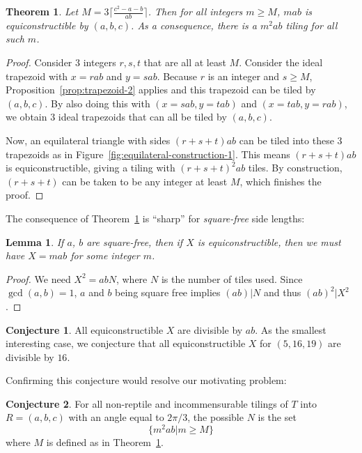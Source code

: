 \documentclass{amsart}
\theoremstyle{plain}
\newtheorem{thm}{Theorem}
\newtheorem{lem}{Lemma}
\theoremstyle{definition}
\newtheorem{conj}{Conjecture}
\begin{document}
\begin{thm}
    \label{thm:equilateral-construction-1} Let $M = 3\lceil \frac{c^2 - a - b}{ab} \rceil$. Then for all integers $m \geq M$, $mab$ is equiconstructible by $(a,b,c)$. As a consequence, there is a $m^2 ab$ tiling for all such $m$.
\end{thm}
\begin{proof}
Consider $3$ integers $r,s,t$ that are all at least $M$. Consider the ideal trapezoid with $x = rab$ and $y = sab$. Because $r$ is an integer and $s \geq M$, Proposition~\ref{prop:trapezoid-2} applies and this trapezoid can be tiled by $(a,b,c)$. By also doing this with $(x = sab, y = tab)$ and $(x = tab, y=rab)$, we obtain $3$ ideal trapezoids that can all be tiled by $(a,b,c)$. 

Now, an equilateral triangle with sides $(r+s+t)ab$ can be tiled into these $3$ trapezoids as in Figure~\ref{fig:equilateral-construction-1}. This means $(r+s+t)ab$ is equiconstructible, giving a tiling with $(r+s+t)^2ab$ tiles. By construction, $(r+s+t)$ can be taken to be any integer at least $M$, which finishes the proof.
\end{proof}

The consequence of Theorem~\ref{thm:equilateral-construction-1} is ``sharp'' for \emph{square-free} side lengths:
\begin{lem}
\label{lem:squarefree}
If $a$, $b$ are square-free, then if $X$ is equiconstructible, then we must have $X = mab$ for some integer $m$.
\end{lem}
\begin{proof}
    We need $X^2 = abN$, where $N$ is the number of tiles used. Since $\gcd(a,b) = 1$, $a$ and $b$ being square free implies $(ab)|N$ and thus $(ab)^2|X^2$. 
\end{proof}
\begin{conj}
\label{conj:equilateral}
All equiconstructible $X$ are divisible by $ab$. As the smallest interesting case, we conjecture that all equiconstructible $X$ for $(5,16,19)$ are divisible by $16$.
\end{conj}
Confirming this conjecture would resolve our motivating problem:
\begin{conj}
    \label{conj:formal-equilaeral}
    For all non-reptile and incommensurable tilings of $T$ into $R = (a,b,c)$ with an angle equal to $2\pi/3$, the possible $N$ is the set 
    $$\{m^2 ab | m \geq M\} $$
    where $M$ is defined as in Theorem~\ref{thm:equilateral-construction-1}.
\end{conj}
\end{document}
